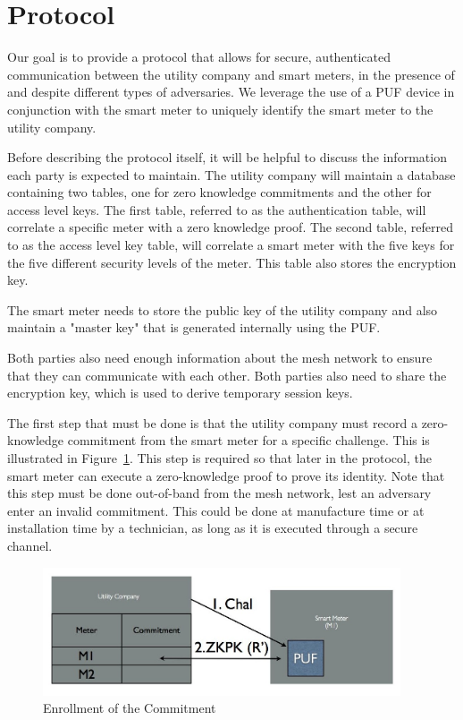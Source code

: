 \section{Protocol}
Our goal is to provide a protocol that allows for secure, authenticated communication between the utility company and
smart meters, in the presence of and despite different types of adversaries.
We leverage the use of a PUF device in conjunction with the smart meter to uniquely identify the smart meter to the
utility company.

Before describing the protocol itself, it will be helpful to discuss the information each party is expected to maintain.
The utility company will maintain a database containing two tables, one for zero knowledge commitments and the 
other for 
access level keys. The first table, referred to as the authentication table, will correlate a specific meter with a zero knowledge proof.
The second table, referred to as the access level key table, will correlate a smart meter with the five keys for the five different security levels of the 
meter. This table also stores the encryption key.

The smart meter needs to store the public key of the utility company and also maintain a "master key"
that is generated internally using the PUF. 

Both parties also need enough information about
the mesh network to ensure that they can communicate with each other. Both parties also need to share the
encryption key, which is used to derive temporary session keys.

The first step that must be done is that the utility company must record a zero-knowledge commitment from the 
smart meter for a specific challenge. This is illustrated in Figure~\ref{fig:doeconfig}. This step is required so that later
in the protocol, the smart meter can execute a zero-knowledge proof to prove its identity.
Note that this step must be done out-of-band from the mesh network, lest an adversary enter an invalid commitment.
This could be done at manufacture time or at installation time by a technician, as long as it is executed through a secure channel.

\begin{figure}[!ht]
\includegraphics[width=400px]{images/doe_auth_config.jpg}
\caption{Enrollment of the Commitment}
\label{fig:doeconfig}
\end{figure}
\FloatBarrier

